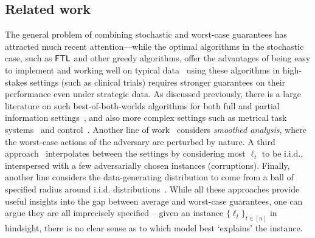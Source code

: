 \subsection{Related work} \label{sec:relatedwork}
The general problem of combining stochastic and worst-case guarantees has attracted much recent attention---while the optimal algorithms in the stochastic case, such as $\mathsf{FTL}$ and other greedy algorithms, offer the advantages of being easy to implement and working well on typical data~\citep{bastani2021mostly} using these algorithms in high-stakes settings (such as clinical trials) requires stronger guarantees on their performance even under strategic data. 
As discussed previously, there is a large literature on such best-of-both-worlds algorithms for both full and partial information settings~\citep{Wei--Luo2018, Bubeck--Li--Luo--Wei2019, Zimmert--Seldin2019, Dann--Wei--Zimmert2023}, and also more complex settings such as metrical task systems~\citep{bhuyan2023best} and control~\citep{sabag2021regret, goel2023best}. Another line of work~\citep{Rakhlin--Sridharan--Tewari2011, Haghtalab--Roughgarden--Shetty2022, Bhatt--Haghtalab--Shetty2023, Block--Dagan--Golowich--Rakhlin2022} considers \emph{smoothed analysis}, where the worst-case actions of the adversary are perturbed by nature. A third approach~\citep{bubeck2012best,Lykouris--Mirrokni--PaesLeme2018, Amir--Attias--Koren--Mansour--Livni2020, Zimmert--Seldin2019} interpolates between the settings by considering most $\ell_t$ to be i.i.d., interspersed with a few adversarially chosen instances (corruptions). Finally, another line considers the data-generating distribution to come from a ball of specified radius around i.i.d. distributions~\citep{mourtada2019optimality, bilodeau2023relaxing}. While all these approaches provide useful insights into the gap between average and worst-case guarantees, one can argue they are all imprecisely specified -- given an instance $\{\ell_t\}_{t\in[n]}$ in hindsight, there is no clear sense as to which model best `explains' the instance.


